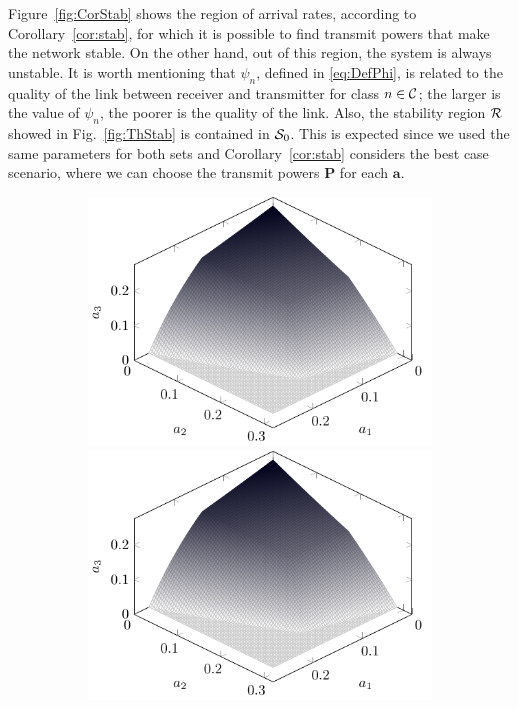 Figure~\ref{fig:CorStab} shows the region of arrival rates, according to Corollary~\ref{cor:stab}, for which it is possible to find transmit powers that make the network stable.
%
On the other hand, out of this region, the system is always unstable. It is worth mentioning that $\psi_n$, defined in \eqref{eq:DefPhi}, is related to the quality of the link between receiver and transmitter for class $n\in\cal{C}$; the larger is the value of $\psi_n$, the poorer is the quality of the link.
%
Also, the stability region $\cal{R}$ showed in Fig.~\ref{fig:ThStab} is contained in $\cal{S}_0$. This is expected since we used the same parameters for both sets and Corollary~\ref{cor:stab} considers the best case scenario, where we can choose the transmit powers $\bm{P}$ for each $\bm{a}$.

\begin{figure}
\centering
\begin{subfigure}[t]{.45\textwidth}
  \centering
    \if{}
        \includegraphics[width=\textwidth]{Figures/Ch7_theorem_stab.pdf}
    \else
        \includegraphics[draft,width=\textwidth]{Figures/Ch7_theorem_stab.pdf}

\end{subfigure}
\end{figure}
